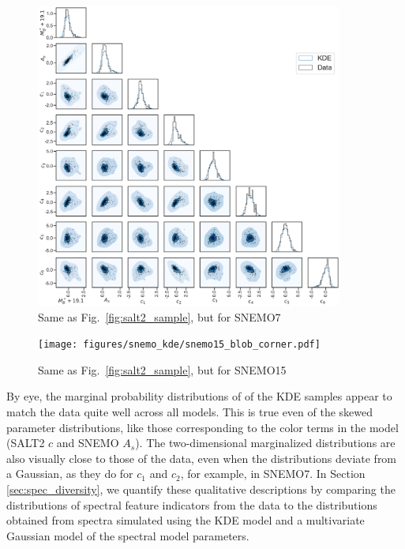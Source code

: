 \begin{figure}
    \centering
\includegraphics[width=0.9\textwidth]{figures/snemo_kde/snemo7_blob_corner.pdf}
    \caption{Same as Fig.~\ref{fig:salt2_sample}, but for SNEMO7}
    \label{fig:snemo7_sample}
\end{figure}

\begin{figure}
    \centering
\texttt{[image: figures/snemo\_kde/snemo15\_blob\_corner.pdf]}
    \caption{Same as Fig.~\ref{fig:salt2_sample}, but for SNEMO15}
    \label{fig:snemo15_sample}
\end{figure}

By eye, the marginal probability distributions of of the KDE samples appear to match the data quite well across all models. This is true even of the skewed parameter distributions, like those corresponding to the color terms in the model (SALT2 $c$ and SNEMO $A_s$). The two-dimensional marginalized distributions are also visually close to those of the data, even when the distributions deviate from a Gaussian, as they do for $c_1$ and $c_2$, for example, in SNEMO7. In Section \ref{sec:spec_diversity}, we quantify these qualitative descriptions by comparing the distributions of spectral feature indicators from the data to the distributions obtained from spectra simulated using the KDE model and a multivariate Gaussian model of the spectral model parameters.



